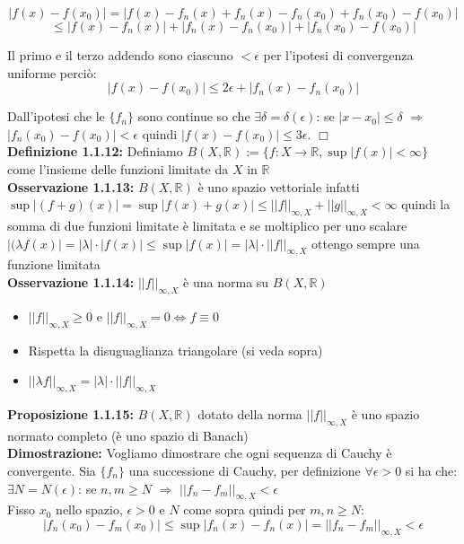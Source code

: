 \documentclass[a4paper,11pt,titlepage]{book}
\begin{document}
$$|f(x)-f(x_0)|=|f(x)-f_{n}(x)+f_{n}(x)-f_{n}(x_{0})+f_{n}(x_{0})-f(x_0)|$$ $$\leq
|f(x)-f_{n}(x)|+|f_{n}(x)-f_{n}(x_{0})|+|f_{n}(x_{0})-f(x_0)|$$

 Il primo e il terzo addendo sono ciascuno $<\epsilon$ per l'ipotesi di convergenza uniforme perciò: 
 $$|f(x)-f(x_0)|\leq 2\epsilon+|f_{n}(x)-f_{n}(x_{0})|$$
 
Dall'ipotesi che le $\{f_{n}\}$ sono continue so che $\exists{\delta}=\delta(\epsilon)$: se $|x-x_0|\leq{\delta}$ $\Rightarrow$ $|f_{n}(x_{0})-f(x_{0})|<\epsilon$ quindi $|f(x)-f(x_0)|\leq 3\epsilon$. $\Box$ \\

\textbf{Definizione 1.1.12:} Definiamo $B(X,\mathbb{R}):=\{f:X\rightarrow\mathbb{R},\sup |f(x)|<\infty\}$ come l'insieme delle funzioni limitate da $X$ in $\mathbb{R}$ \\

\textbf{Osservazione 1.1.13:} $B(X,\mathbb{R})$ è uno spazio vettoriale infatti $\sup |(f+g)(x)|=\sup |f(x)+g(x)|\leq ||f||_{\infty,X}+||g||_{\infty,X}<\infty$ quindi la somma di due funzioni limitate è limitata e se moltiplico per uno scalare $|(\lambda f(x)|=|\lambda |\cdot |f(x)|\leq \sup |f(x)|=|\lambda | \cdot ||f||_{\infty,X}$ ottengo sempre una funzione limitata\\

\textbf{Osservazione 1.1.14:} $||f||_{\infty,X}$ è una norma su $B(X,\mathbb{R})$
\begin{itemize}
\item $||f||_{\infty,X}\geq 0$ e $||f||_{\infty,X}=0\Leftrightarrow f\equiv 0$
\item Rispetta la disuguaglianza triangolare (si veda sopra)
\item $||\lambda f||_{\infty,X}=|\lambda |\cdot ||f||_{\infty,X}$ \\
\end{itemize}

\textbf{Proposizione 1.1.15:} $B(X,\mathbb{R})$ dotato della norma $||f||_{\infty,X}$ è uno spazio normato completo (è uno spazio di Banach) \\

\textbf{Dimostrazione:} Vogliamo dimostrare che ogni sequenza di Cauchy è convergente. Sia $\{f_{n}\}$ una successione di Cauchy, per definizione $\forall{\epsilon}>0$ si ha che: $\exists{N}=N(\epsilon)$: se $n,m\geq{N}$ $\Rightarrow$ $||f_{n}-f_{m}||_{\infty,X}<\epsilon$\\

Fisso $x_0$ nello spazio, $\epsilon >0$ e $ N $ come sopra quindi per $m,n \geq N$:  
$$|f_{n}(x_0)-f_{m}(x_0)|\leq \sup|f_{n}(x)-f_{n}(x)|=||f_{n}-f_{m}||_{\infty,X}<\epsilon$$ 
\end{document}
